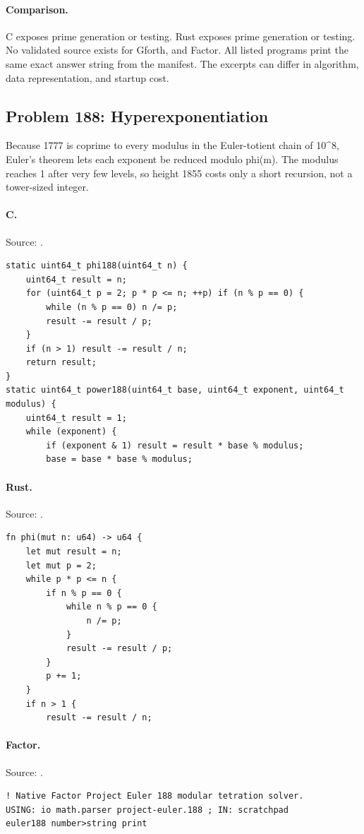\paragraph{Comparison.}
C exposes prime generation or testing. Rust exposes prime generation or testing.
No validated source exists for Gforth, and Factor.
All listed programs print the same exact answer string from the manifest. The excerpts can differ in algorithm, data representation, and startup cost.

\subsection{Problem 188: Hyperexponentiation}
\label{walkthrough:p188}
Because 1777 is coprime to every modulus in the Euler-totient chain of 10\textasciicircum{}8, Euler's theorem lets each exponent be reduced modulo phi(m). The modulus reaches 1 after very few levels, so height 1855 costs only a short recursion, not a tower-sized integer.

\paragraph{C.} Source: .
\begin{lstlisting}
static uint64_t phi188(uint64_t n) {
    uint64_t result = n;
    for (uint64_t p = 2; p * p <= n; ++p) if (n % p == 0) {
        while (n % p == 0) n /= p;
        result -= result / p;
    }
    if (n > 1) result -= result / n;
    return result;
}
static uint64_t power188(uint64_t base, uint64_t exponent, uint64_t modulus) {
    uint64_t result = 1;
    while (exponent) {
        if (exponent & 1) result = result * base % modulus;
        base = base * base % modulus;
\end{lstlisting}

\paragraph{Rust.} Source: .
\begin{lstlisting}
fn phi(mut n: u64) -> u64 {
    let mut result = n;
    let mut p = 2;
    while p * p <= n {
        if n % p == 0 {
            while n % p == 0 {
                n /= p;
            }
            result -= result / p;
        }
        p += 1;
    }
    if n > 1 {
        result -= result / n;
\end{lstlisting}

\paragraph{Factor.} Source: .
\begin{lstlisting}
! Native Factor Project Euler 188 modular tetration solver.
USING: io math.parser project-euler.188 ; IN: scratchpad
euler188 number>string print
\end{lstlisting}


